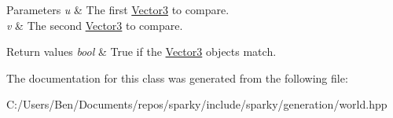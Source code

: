 \begin{DoxyParams}{Parameters}
{\em u} & The first \hyperlink{classsparky_1_1_vector3}{Vector3} to compare. \\
\hline
{\em v} & The second \hyperlink{classsparky_1_1_vector3}{Vector3} to compare.\\
\hline
\end{DoxyParams}

\begin{DoxyRetVals}{Return values}
{\em bool} & True if the \hyperlink{classsparky_1_1_vector3}{Vector3} objects match. \\
\hline
\end{DoxyRetVals}


The documentation for this class was generated from the following file\+:\begin{DoxyCompactItemize}
\item 
C\+:/\+Users/\+Ben/\+Documents/repos/sparky/include/sparky/generation/world.\+hpp\end{DoxyCompactItemize}
